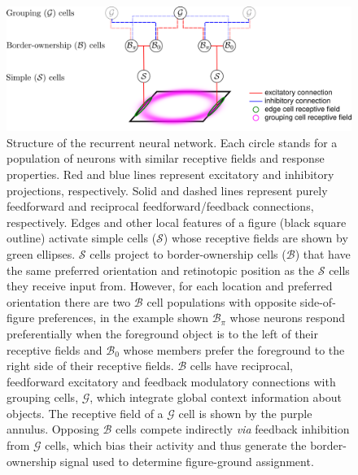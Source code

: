 \begin{figure}[t!]
\centering
\includegraphics[width=\textwidth]{NaturalImage/figs/model_circuit.png}
\makeatletter
\let\@currsize\normalsize
\caption[Structure of the recurrent neural network model for figure-ground organization of natural scenes]{Structure of the recurrent neural network. Each circle stands for a population of neurons with similar receptive fields and response properties. Red and blue lines represent excitatory and inhibitory projections, respectively. Solid and dashed lines represent purely feedforward and reciprocal feedforward/feedback connections, respectively. Edges and other local features of a figure (black square outline) activate simple cells ($\mathcal{S}$) whose receptive fields are shown by green ellipses. $\mathcal{S}$ cells project to border-ownership cells ($\mathcal{B}$) that have the same preferred orientation and retinotopic position as the $\mathcal{S}$ cells they receive input  from. However, for each location and preferred orientation there are  two $\mathcal{B}$ cell populations with opposite side-of-figure preferences, in the example shown $\mathcal{B}_{\pi}$ whose neurons respond preferentially when the foreground object is to the left of their receptive fields and $\mathcal{B}_{0}$ whose members prefer the foreground to the right side of their receptive fields. $\mathcal{B}$ cells have reciprocal, feedforward excitatory and feedback modulatory connections with grouping cells, $\mathcal{G}$, which integrate global context information about objects. The receptive field of a $\mathcal{G}$ cell is shown by the purple annulus. Opposing $\mathcal{B}$ cells compete indirectly {\em via} feedback inhibition  from $\mathcal{G}$ cells, which bias their activity and thus generate the border-ownership signal used to determine figure-ground assignment.}
\label{Fig:model}
\end{figure}

